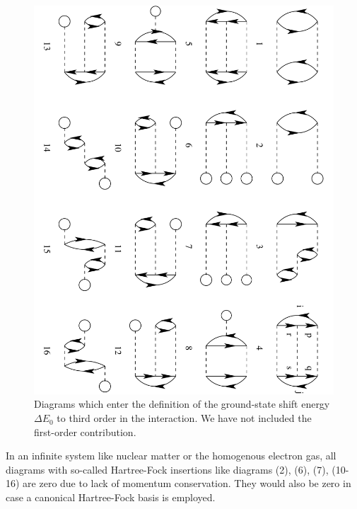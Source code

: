 \begin{figure}
    \includegraphics[width=\linewidth]{Chapter8-figures/mbpt.pdf}
      \caption{Diagrams which enter the definition of the ground-state
      shift energy $\Delta E_0$ to third order in the interaction. We have not included the first-order contribution.}
      \label{fig:goldstone}
\end{figure}
In an infinite system like nuclear matter or the homogenous electron gas, all diagrams with so-called Hartree-Fock insertions like diagrams (2), (6), (7), (10-16) are zero 
due to lack of momentum conservation. They would also be zero in case a canonical \cite{shavittbartlett2009} Hartree-Fock basis is employed. 

